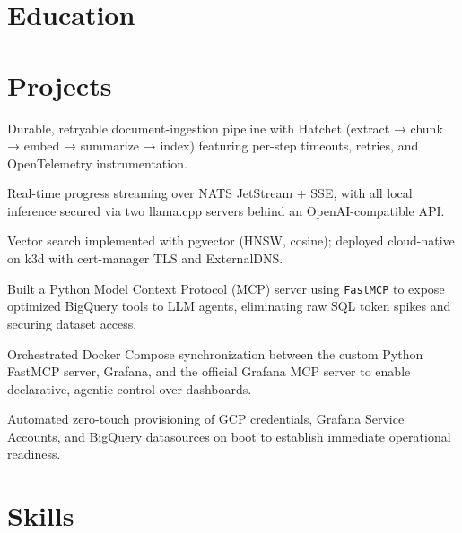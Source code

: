 \documentclass[10pt,a4paper]{resume}
\begin{document}
\section{Education}

\vspace{2pt}

\section{Projects}

\bullets
  \item Durable, retryable document-ingestion pipeline with Hatchet (extract → chunk → embed → summarize → index) featuring per-step timeouts, retries, and OpenTelemetry instrumentation.
  \item Real-time progress streaming over NATS JetStream + SSE, with all local inference secured via two llama.cpp servers behind an OpenAI-compatible API.
  \item Vector search implemented with pgvector (HNSW, cosine); deployed cloud-native on k3d with cert-manager TLS and ExternalDNS.
\bulletsend
\vspace{1.0pt}
\bullets
  \item Built a Python Model Context Protocol (MCP) server using \texttt{FastMCP} to expose optimized BigQuery tools to LLM agents, eliminating raw SQL token spikes and securing dataset access.
  \item Orchestrated Docker Compose synchronization between the custom Python FastMCP server, Grafana, and the official Grafana MCP server to enable declarative, agentic control over dashboards.
  \item Automated zero-touch provisioning of GCP credentials, Grafana Service Accounts, and BigQuery datasources on boot to establish immediate operational readiness.
\bulletsend

\section{Skills}
\end{document}

